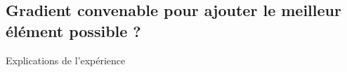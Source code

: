 \subsection{Gradient convenable pour ajouter le meilleur élément possible ?}
\begin{frame}{Explications de l'expérience}
\begin{figure}\centering
\end{figure}
\end{frame}


